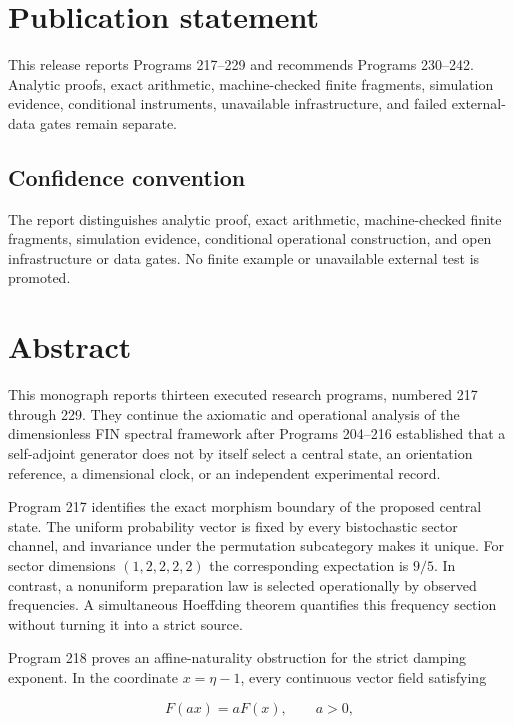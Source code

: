 \documentclass[11pt,a4paper,openany]{report}
\begin{document}
\chapter*{Publication statement}
This release reports Programs 217--229 and recommends Programs 230--242.
Analytic proofs, exact arithmetic, machine-checked finite fragments,
simulation evidence, conditional instruments, unavailable infrastructure,
and failed external-data gates remain separate.

\tableofcontents
\clearpage
{}

\section{Confidence convention}

The report distinguishes analytic proof, exact arithmetic, machine-checked finite fragments, simulation evidence, conditional operational construction, and open infrastructure or data gates. No finite example or unavailable external test is promoted.

\chapter{Abstract}

This monograph reports thirteen executed research programs, numbered 217 through 229. They continue the axiomatic and operational analysis of the dimensionless FIN spectral framework after Programs 204--216 established that a self-adjoint generator does not by itself select a central state, an orientation reference, a dimensional clock, or an independent experimental record.

Program 217 identifies the exact morphism boundary of the proposed central state. The uniform probability vector is fixed by every bistochastic sector channel, and invariance under the permutation subcategory makes it unique. For sector dimensions \((1,2,2,2,2)\) the corresponding expectation is \(9/5\). In contrast, a nonuniform preparation law is selected operationally by observed frequencies. A simultaneous Hoeffding theorem quantifies this frequency section without turning it into a strict source.

Program 218 proves an affine-naturality obstruction for the strict damping exponent. In the coordinate \(x=\eta-1\), every continuous vector field satisfying

\[
F(ax)=aF(x),
\qquad a>0,
\]
\end{document}

